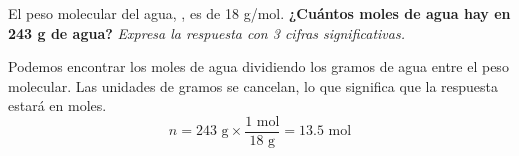 El peso molecular del agua, , es de 18 g/mol.
\textbf{¿Cuántos moles de agua hay en 243 g de agua?}
\emph{Expresa la respuesta con 3 cifras significativas.}

\begin{solutionbox}{4cm}
    Podemos encontrar los moles de agua dividiendo los gramos de agua entre el peso molecular. Las unidades de gramos se cancelan, lo que significa que la respuesta estará en moles.
    \[ n =  243 \text{ g} \times \frac{1 \text{ mol}}{18 \text{ g}} = 13.5 \text{ mol} \]
\end{solutionbox}